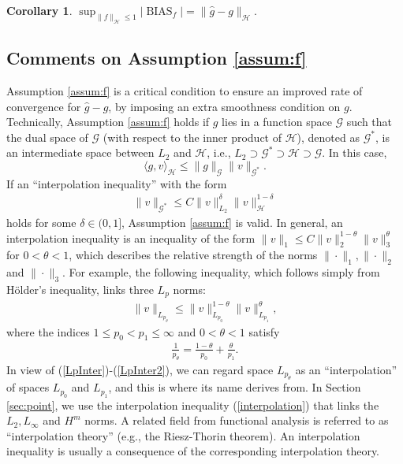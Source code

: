 \documentclass[12pt]{article}
\theoremstyle{plain}
\newtheorem{corollary}{Corollary}
\theoremstyle{remark}
\begin{document}
\begin{corollary}\label{coro:worstcase}
    $\sup_{\|f\|_\mathcal{H}\leq 1}|\operatorname{BIAS}_f|=\|\hat{g}-g\|_\mathcal{H}.$
\end{corollary}


\subsection{Comments on Assumption \ref{assum:f}}\label{sec:A2}
Assumption \ref{assum:f} is a critical condition to ensure an improved rate of convergence for $\hat{g}-g$, by imposing an extra smoothness condition on $g$. Technically, Assumption \ref{assum:f} holds if $g$ lies in a function space $\mathcal{G}$ such that the dual space of $\mathcal{G}$ (with respect to the inner product of $\mathcal{H}$), denoted as $\mathcal{G}^*$, is an intermediate space between $L_2$ and $\mathcal{H}$, i.e., $L_2\supset \mathcal{G}^*\supset \mathcal{H}\supset \mathcal{G}$. In this case,
\[\langle g,v\rangle_\mathcal{H}\leq \|g\|_{\mathcal{G}}\|v\|_{\mathcal{G}^*}.\]
If an ``interpolation inequality'' with the form
\begin{eqnarray}\label{Ineq}
    \|v\|_{\mathcal{G}^*}\leq C\|v\|_{L_2}^\delta\|v\|_\mathcal{H}^{1-\delta}
\end{eqnarray}
holds for some $\delta\in (0,1]$, Assumption \ref{assum:f} is valid. In general, an interpolation inequality is an inequality of the form $\|v\|_{1}\leq C\|v\|_2^{1-\theta}\|v\|_3^{\theta}$ for $0<\theta<1$, which describes the relative strength of the norms $\|\cdot\|_1,\|\cdot\|_2$ and $\|\cdot\|_3$. For example, the following inequality, which follows simply from H\"older's inequality, links three $L_p$ norms: 
\begin{eqnarray}\label{LpInter}
    \|v\|_{L_{p_\theta}}\leq \|v\|^{1-\theta}_{L_{p_0}}\|v\|^\theta_{L_{p_1}},
\end{eqnarray}
where the indices $1\leq p_0<p_1\leq \infty$ and $0<\theta<1$ satisfy
\begin{eqnarray}\label{LpInter2}
   \frac{1}{p_\theta}=\frac{1-\theta}{p_0}+\frac{\theta}{p_1}. 
\end{eqnarray}
In view of (\ref{LpInter})-(\ref{LpInter2}), we can regard space $L_{p_\theta}$ as an ``interpolation'' of spaces $L_{p_0}$ and $L_{p_1}$, and this is where its name derives from. 
In Section \ref{sec:point}, we use the interpolation inequality (\ref{interpolation}) that links the $L_2,L_\infty$ and $H^m$ norms. A related field from functional analysis is referred to as ``interpolation theory'' (e.g., the Riesz-Thorin theorem). An interpolation inequality is usually a consequence of the corresponding interpolation theory.
\end{document}
